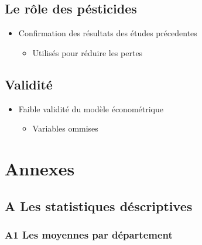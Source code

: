 \documentclass[11pt,]{article}
\providecommand{\tightlist}{%
  \setlength{\itemsep}{0pt}\setlength{\parskip}{0pt}}
\begin{document}
\FloatBarrier

\hypertarget{le-role-des-pesticides}{%
\subsection{Le rôle des pésticides}\label{le-role-des-pesticides}}

\begin{itemize}
\tightlist
\item
  Confirmation des résultats des études précedentes

  \begin{itemize}
  \tightlist
  \item
    Utilisés pour réduire les pertes
  \end{itemize}
\end{itemize}

\FloatBarrier

\hypertarget{validite}{%
\subsection{Validité}\label{validite}}

\begin{itemize}
\tightlist
\item
  Faible validité du modèle économétrique

  \begin{itemize}
  \tightlist
  \item
    Variables ommises
  \end{itemize}
\end{itemize}

\FloatBarrier

\newpage

\hypertarget{annexes}{%
\section{Annexes}\label{annexes}}

\hypertarget{a-les-statistiques-descriptives}{%
\subsection{A Les statistiques
déscriptives}\label{a-les-statistiques-descriptives}}

\hypertarget{a1-les-moyennes-par-departement}{%
\subsubsection{A1 Les moyennes par
département}\label{a1-les-moyennes-par-departement}}
\end{document}
